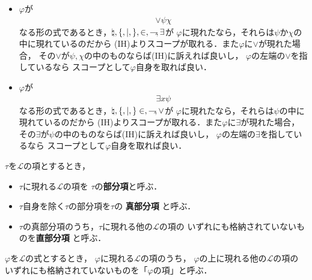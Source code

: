 \begin{metaprf}
\begin{description}
\begin{itemize}
					\item $\varphi$が
						\begin{align}
							\vee \psi \chi
						\end{align}
						なる形の式であるとき，$\natural,\{,|,\},\in,\rightharpoondown\hspace{-0.25em},\exists$が
						$\varphi$に現れたなら，それらは$\psi$か$\chi$の中に現れているのだから
						(IH)よりスコープが取れる．また$\varphi$に$\vee$が現れた場合，
						その$\vee$が$\psi,\chi$の中のものならば(IH)に訴えれば良いし，
						$\varphi$の左端の$\vee$を指しているなら
						スコープとして$\varphi$自身を取れば良い．
						
					\item $\varphi$が
						\begin{align}
							\exists x \psi
						\end{align}
						なる形の式であるとき，$\natural,\{,|,\}\in,\rightharpoondown\hspace{-0.25em},\vee$が
						$\varphi$に現れたなら，それらは$\psi$の中に現れているのだから
						(IH)よりスコープが取れる．また$\varphi$に$\exists$が現れた場合，
						その$\exists$が$\psi$の中のものならば(IH)に訴えれば良いし，
						$\varphi$の左端の$\exists$を指しているなら
						スコープとして$\varphi$自身を取れば良い．
						\QED
				\end{itemize}
		\end{description}
	\end{metaprf}
	
	\begin{screen}
		\begin{metadfn}\label{metadfn:L_subterm_of_term}
			$\tau$を$\mathcal{L}$の項とするとき，
			\begin{itemize}
				\item $\tau$に現れる$\mathcal{L}$の項を
					$\tau$の{\bf 部分項}と呼ぶ．
				\item $\tau$自身を除く$\tau$の部分項を$\tau$の
					{\bf 真部分項}
					と呼ぶ．
				\item $\tau$の真部分項のうち，$\tau$に現れる他の$\mathcal{L}$の項の
					いずれにも格納されていないものを{\bf 直部分項}
					と呼ぶ．
			\end{itemize}
		\end{metadfn}
	\end{screen}
	
	\begin{screen}
		\begin{metadfn}
		\label{metadfn:L_term_of_formula}
			$\varphi$を$\mathcal{L}$の式とするとき，
			$\varphi$に現れる$\mathcal{L}$の項のうち，
			$\varphi$の上に現れる他の$\mathcal{L}$の項の
			いずれにも格納されていないものを「$\varphi$の項」と呼ぶ．
		\end{metadfn}
	\end{screen}
	
